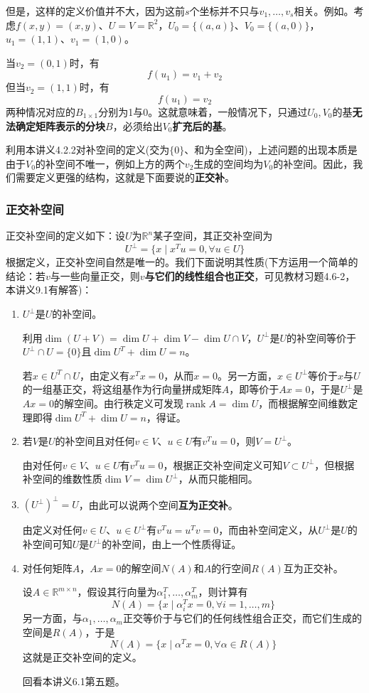 \documentclass[a4paper,UTF8,fontset=windows]{ctexart}
\DeclareMathOperator{\rank}{rank}
\newcommand*{\note}{\noindent *}
\begin{document}
但是，这样的定义价值并不大，因为这前$s$个坐标并不只与$v_1,\dots,v_s$相关。例如。考虑$f(x,y)=(x,y)$、$U=V=\mathbb{R}^2$，$U_0=\{(a,a)\}$、$V_0=\{(a,0)\}$，$u_1=(1,1)$、$v_1=(1,0)$。

当$v_2=(0,1)$时，有
$$f(u_1)=v_1+v_2$$
但当$v_2=(1,1)$时，有
$$f(u_1)=v_2$$
两种情况对应的$B_{1\times 1}$分别为1与0。这就意味着，一般情况下，只通过$U_0,V_0$的基\textbf{无法确定矩阵表示的分块}$B$，必须给出$V_0$\textbf{扩充后的基}。

利用本讲义4.2.2对补空间的定义(交为$\{0\}$、和为全空间)，上述问题的出现本质是由于$V_0$的补空间不唯一，例如上方的两个$v_2$生成的空间均为$V_0$的补空间。因此，我们需要定义更强的结构，这就是下面要说的\textbf{正交补}。

\subsubsection{正交补空间}
正交补空间的定义如下：设$U$为$\mathbb{R}^n$某子空间，其正交补空间为
$$U^\bot=\{x\mid x^Tu=0,\forall u\in U\}$$
根据定义，正交补空间自然是唯一的。我们下面说明其性质(下方运用一个简单的结论：若$v$与一些向量正交，则$v$\textbf{与它们的线性组合也正交}，可见教材习题4.6-2，本讲义9.1有解答)：
\begin{enumerate}
    \item $U^\bot$是$U$的补空间。
    
    利用$\dim(U+V)=\dim U+\dim V-\dim U\cap V$，$U^\bot$是$U$的补空间等价于$U^\bot\cap U=\{0\}$且$\dim U^T+\dim U=n$。
    
    若$x\in U^T\cap U$，由定义有$x^Tx=0$，从而$x=0$。另一方面，$x\in U^\bot$等价于$x$与$U$的一组基正交，将这组基作为行向量拼成矩阵$A$，即等价于$Ax=0$，于是$U^\bot$是$Ax=0$的解空间。由行秩定义可发现$\rank A=\dim U$，而根据解空间维数定理即得$\dim U^T+\dim U=n$，得证。
    
    \item 若$V$是$U$的补空间且对任何$v\in V$、$u\in U$有$v^Tu=0$，则$V=U^\bot$。
    
    由对任何$v\in V$、$u\in U$有$v^Tu=0$，根据正交补空间定义可知$V\subset U^\bot$，但根据补空间的维数性质$\dim V=\dim U^\bot$，从而只能相同。
    
    \item $(U^\bot)^\bot=U$，由此可以说两个空间\textbf{互为正交补}。
    
    由定义对任何$v\in U$、$u\in U^\bot$有$v^Tu=u^Tv=0$，而由补空间定义，从$U^\bot$是$U$的补空间可知$U$是$U^\bot$的补空间，由上一个性质得证。

    \item 对任何矩阵$A$，$Ax=0$的解空间$N(A)$和$A$的行空间$R(A)$互为正交补。
    
    设$A\in\mathbb{R}^{m\times n}$，假设其行向量为$\alpha_1^T,\dots,\alpha_m^T$，则计算有
    $$N(A)=\{x\mid\alpha_i^Tx=0,\forall i=1,\dots,m\}$$
    另一方面，与$\alpha_1,\dots,\alpha_m$正交等价于与它们的任何线性组合正交，而它们生成的空间是$R(A)$，于是
    $$N(A)=\{x\mid\alpha^Tx=0,\forall\alpha\in R(A)\}$$
    这就是正交补空间的定义。

    \note 回看本讲义6.1第五题。
\end{enumerate}
\end{document}
